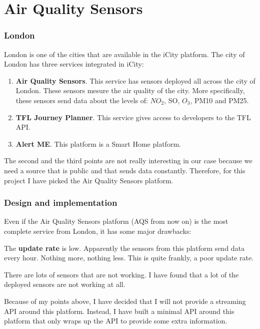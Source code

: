  
\section{Air Quality Sensors}
\label{sec:implementation_aqs}

\subsubsection*{London}

London is one of the cities that are available in the iCity platform. The city
of London has three services integrated in iCity:

\begin{enumerate}
  \itemsep0em
  \item {\bf Air Quality Sensors}. This service has sensors deployed all across
the city of London. These sensors mesure the air quality of the city. More
specifically, these sensors send data about the levels of: $NO_2$, SO, $O_3$,
PM10 and PM25.
  \item {\bf TFL Journey Planner}. This service gives access to developers to
the TFL API.
  \item {\bf Alert ME}. This platform is a Smart Home platform.
\end{enumerate}

The second and the third points are not really interesting in our case because
we need a source that is public and that sends data constantly. Therefore, for
this project I have picked the Air Quality Sensors platform.

\subsubsection*{Design and implementation}

Even if the Air Quality Sensors platform (AQS from now on) is the most complete
service from London, it has some major drawbacks:

\mylist
  \item The {\bf update rate} is low. Apparently the sensors from this platform
send data every hour. Nothing more, nothing less. This is quite frankly, a
poor update rate.
  \item There are lots of sensors that are not working. I have found that a lot
of the deployed sensors are not working at all.
\mylistend

Because of my points above, I have decided that I will not provide a streaming
API around this platform. Instead, I have built a minimal API around this
platform that only wraps up the API to provide some extra information.

